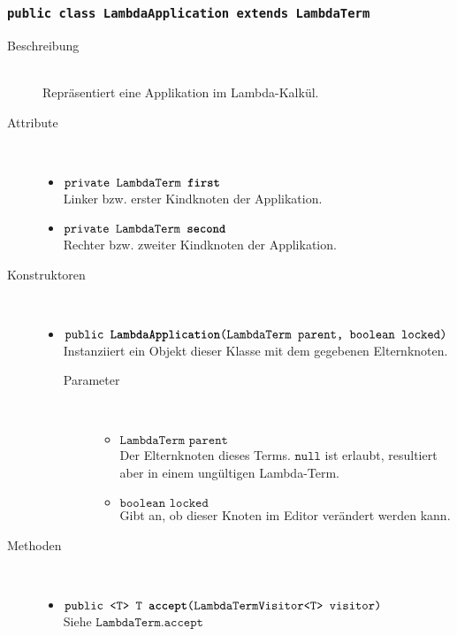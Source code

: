 \subsubsection{\normalfont \texttt{public class \textbf{LambdaApplication} extends LambdaTerm}}

\begin{description}
\item[Beschreibung] \hfill \\ Repräsentiert eine Applikation im Lambda-Kalkül.
\item[Attribute] \hfill \\
	\vspace{-.8cm}
	\begin{itemize}
		\item $\texttt{private LambdaTerm \textbf{first}}$ \\ Linker bzw. erster Kindknoten der Applikation.
		\item $\texttt{private LambdaTerm \textbf{second}}$ \\ Rechter bzw. zweiter Kindknoten der Applikation.
	\end{itemize}
	
\item[Konstruktoren] \hfill \\
	\vspace{-.8cm}
	\begin{itemize}
		\item $\texttt{public \textbf{LambdaApplication}(LambdaTerm parent, boolean locked)}$ \\ Instanziiert ein Objekt dieser Klasse mit dem gegebenen Elternknoten.
		\begin{description}
			\item[Parameter] \hfill \\
			\vspace{-.8cm}
			\begin{itemize}
				\item $\texttt{LambdaTerm parent}$ \\ Der Elternknoten dieses Terms. $\texttt{null}$ ist erlaubt, resultiert aber in einem ungültigen Lambda-Term.
				\item $\texttt{boolean locked}$ \\ Gibt an, ob dieser Knoten im Editor verändert werden kann.
			\end{itemize}
		\end{description}
	\end{itemize}
	
\item[Methoden] \hfill \\
	\vspace{-.8cm}
	\begin{itemize}
		\item $\texttt{public <T> T \textbf{accept}(LambdaTermVisitor<T> visitor)}$ \\ Siehe $\texttt{LambdaTerm.accept}$
		

\end{itemize}
\end{description}
